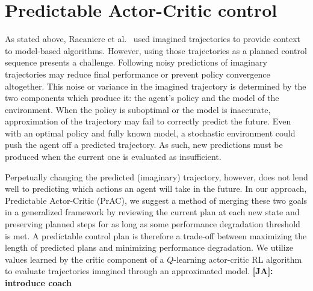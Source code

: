 \documentclass[letterpaper]{article} %
\newcommand{\JA}[1] {{\color{red} \textbf{[JA]: #1}}}
\begin{document}

\section{Predictable Actor-Critic control} \label{section:PAC}


As stated above, Racaniere et al.~\citeyear{racaniere2017imagination} used imagined trajectories to provide context to model-based algorithms. However, using those trajectories as a planned control sequence presents a challenge. Following noisy predictions of imaginary trajectories may reduce final performance or prevent policy convergence altogether. This noise or variance in the imagined trajectory is determined by the two components which produce it: the agent's policy and the model of the environment. When the policy is suboptimal or the model is inaccurate, approximation of the trajectory may fail to correctly predict the future. Even with an optimal policy and fully known model, a stochastic environment could push the agent off a predicted trajectory. As such, new predictions must be produced when the current one is evaluated as insufficient.

Perpetually changing the predicted (imaginary) trajectory, however, does not lend well to predicting which actions an agent will take in the future.
In our approach, Predictable Actor-Critic (PrAC), we suggest a method of merging these two goals in a generalized framework by reviewing the current plan at each new state and preserving planned steps for as long as some performance degradation threshold is met.
A predictable control plan is therefore a trade-off between maximizing the length of predicted plans and minimizing performance degradation. We utilize values learned by the critic component of a $Q$-learning actor-critic RL algorithm to evaluate trajectories imagined through an approximated model. \JA{introduce coach} 
\end{document}
